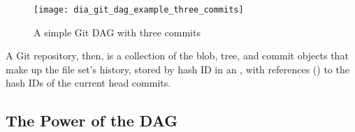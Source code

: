 \begin{figure}[h]
    \centering
    \texttt{[image: dia\_git\_dag\_example\_three\_commits]}
    \caption{A simple Git DAG with three commits}
    \label{dia_git_dag_example_three_commits}
\end{figure}

A Git repository, then, is a collection of the blob, tree, and commit objects
that make up the file set's history, stored by hash ID in an , with references () to the hash IDs of the current head
commits\cite{git_initial_readme}.

%

\subsection{The Power of the DAG}


